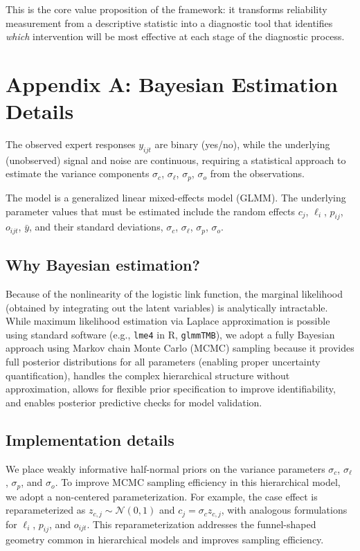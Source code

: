 \documentclass[num-refs]{wiley-article}
\begin{document}
This is the core value proposition of the framework: it transforms reliability measurement from a descriptive statistic into a diagnostic tool that identifies \textit{which} intervention will be most effective at each stage of the diagnostic process.

\section*{Appendix A: Bayesian Estimation Details}\label{section-estimation}

The observed expert responses $y_{ijt}$ are binary (yes/no), while the underlying (unobserved) signal and noise are continuous, requiring a statistical approach to estimate the variance components $\sigma_c$, $\sigma_\ell$, $\sigma_p$, $\sigma_o$ from the observations.

The model is a generalized linear mixed-effects model (GLMM). The underlying parameter values that must be estimated include the random effects $c_j$, $\ell_i$, $p_{ij}$, $o_{ijt}$, $\bar{y}$, and their standard deviations, $\sigma_c$, $\sigma_\ell$, $\sigma_p$, $\sigma_o$.

\subsection*{Why Bayesian estimation?}
Because of the nonlinearity of the logistic link function, the marginal likelihood (obtained by integrating out the latent variables) is analytically intractable. While maximum likelihood estimation via Laplace approximation is possible using standard software (e.g., \texttt{lme4} in R, \texttt{glmmTMB}), we adopt a fully Bayesian approach using Markov chain Monte Carlo (MCMC) sampling because it provides full posterior distributions for all parameters (enabling proper uncertainty quantification), handles the complex hierarchical structure without approximation, allows for flexible prior specification to improve identifiability, and enables posterior predictive checks for model validation.

\subsection*{Implementation details}
We place weakly informative half-normal priors on the variance parameters $\sigma_c$, $\sigma_\ell$, $\sigma_p$, and $\sigma_o$. To improve MCMC sampling efficiency in this hierarchical model, we adopt a non-centered parameterization. For example, the case effect is reparameterized as $z_{c,j} \sim \mathcal{N}(0,1)$ and $c_j = \sigma_c z_{c,j}$, with analogous formulations for $\ell_i$, $p_{ij}$, and $o_{ijt}$. This reparameterization addresses the funnel-shaped geometry common in hierarchical models and improves sampling efficiency.
\end{document}
